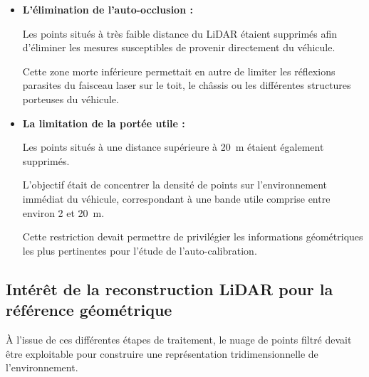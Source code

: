 \documentclass[12pt,a4paper,oneside]{report}
\begin{document}
\begin{itemize}[itemsep=1em, leftmargin=1.5cm, label=\textbullet]

\item \textbf{L'élimination de l'auto-occlusion :}\vspace{0.05cm}

\hspace*{0.5cm}Les points situés à très faible distance du LiDAR étaient supprimés afin d'éliminer les mesures susceptibles de provenir directement du véhicule.\vspace{0.05cm}

\hspace*{0.5cm}Cette zone morte inférieure permettait en autre de limiter les réflexions parasites du faisceau laser sur le toit, le châssis ou les différentes structures porteuses du véhicule.

\item \textbf{La limitation de la portée utile :}\vspace{0.05cm}

\hspace*{0.5cm}Les points situés à une distance supérieure à 20~m étaient également supprimés.\vspace{0.05cm}

\hspace*{0.5cm}L'objectif était de concentrer la densité de points sur l'environnement immédiat du véhicule, correspondant à une bande utile comprise entre environ 2 et 20~m.\vspace{0.05cm}

\hspace*{0.5cm}Cette restriction devait permettre de privilégier les informations géométriques les plus pertinentes pour l'étude de l'auto-calibration.

\end{itemize}

\newpage

\subsection{Intérêt de la reconstruction LiDAR pour la référence géométrique}

\hspace*{1cm}À l'issue de ces différentes étapes de traitement, le nuage de points filtré devait être exploitable pour construire une représentation tridimensionnelle de l'environnement.\vspace{0.5cm}
\end{document}
